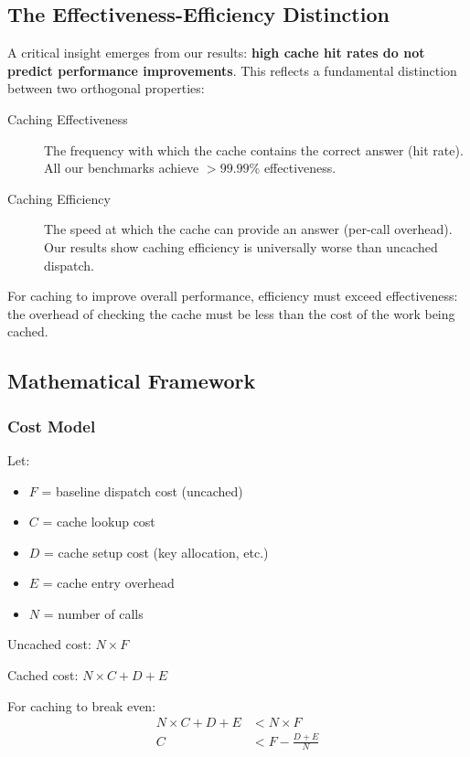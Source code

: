 \documentclass[sigplan,final]{acmart}
\begin{document}
\subsection{The Effectiveness-Efficiency Distinction}

A critical insight emerges from our results: \textbf{high cache hit rates do not predict
performance improvements}. This reflects a fundamental distinction between two orthogonal
properties:

\begin{description}
  \item[Caching Effectiveness] The frequency with which the cache contains the correct answer
    (hit rate). All our benchmarks achieve $>99.99\%$ effectiveness.

  \item[Caching Efficiency] The speed at which the cache can provide an answer (per-call overhead).
    Our results show caching efficiency is universally worse than uncached dispatch.
\end{description}

For caching to improve overall performance, efficiency must exceed effectiveness: the overhead
of checking the cache must be less than the cost of the work being cached.

\subsection{Mathematical Framework}

\subsubsection{Cost Model}

Let:
\begin{itemize}
  \item $F$ = baseline dispatch cost (uncached)
  \item $C$ = cache lookup cost
  \item $D$ = cache setup cost (key allocation, etc.)
  \item $E$ = cache entry overhead
  \item $N$ = number of calls
\end{itemize}

Uncached cost: $N \times F$

Cached cost: $N \times C + D + E$

For caching to break even:
\begin{align}
N \times C + D + E &< N \times F \\
C &< F - \frac{D + E}{N}
\end{align}
\end{document}

